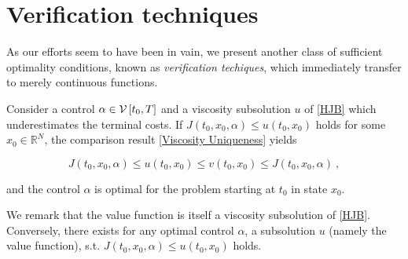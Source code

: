 \section{Verification techniques}

As our efforts seem to have been in vain, we present another class of sufficient optimality conditions, known as \emph{verification techiques}, which immediately transfer to merely continuous functions.

Consider a control $ \alpha \in \mathcal{V}\left[ {t_0}, T \right] $ and a viscosity subsolution $ u $ of \eqref{HJB} which underestimates the terminal costs. If $ J(t_0, x_0, \alpha) \leq u(t_0, x_0) $ holds for some $ x_0 \in \mathbb{R}^N $, the comparison result \ref{Viscosity Uniqueness} yields

\begin{equation*}
	J(t_0, x_0, \alpha) \leq u(t_0, x_0) \leq v(t_0, x_0) \leq J(t_0, x_0, \alpha) \ ,
\end{equation*}

and the control $ \alpha $ is optimal for the problem starting at $ t_0 $ in state $ x_0 $.

We remark that the value function is itself a viscosity subsolution of \eqref{HJB}. Conversely, there exists for any optimal control $ \alpha $, a subsolution $ u $ (namely the value function), s.t. $ J(t_0, x_0, \alpha) \leq u(t_0, x_0) $ holds.